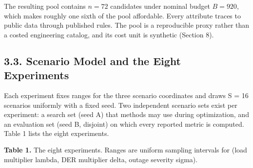 \documentclass[
  10pt,
  a4paper,
]{article}
\begin{document}
The resulting pool contains \(n=72\) candidates under nominal budget
\(B=920\), which makes roughly one sixth of the pool affordable. Every
attribute traces to public data through published rules. The pool is a
reproducible proxy rather than a costed engineering catalog, and its
cost unit is synthetic (Section 8).

\subsection{3.3. Scenario Model and the Eight
Experiments}\label{scenario-model-and-the-eight-experiments}

Each experiment fixes ranges for the three scenario coordinates and
draws \textbar S\textbar{} = 16 scenarios uniformly with a fixed seed.
Two independent scenario sets exist per experiment: a search set (seed
A) that methods may use during optimization, and an evaluation set (seed
B, disjoint) on which every reported metric is computed. Table 1 lists
the eight experiments.

\textbf{Table 1.} The eight experiments. Ranges are uniform sampling
intervals for (load multiplier lambda, DER multiplier delta, outage
severity sigma).
\end{document}
